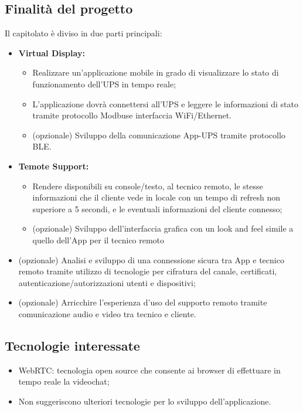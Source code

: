 	\subsection{Finalità del progetto}
		Il capitolato è diviso in due parti principali:
		\begin {itemize}
			\item \textbf{Virtual Display:}
			\begin{itemize}
				\item Realizzare un’applicazione mobile in grado di visualizzare lo stato di funzionamento dell’UPS in tempo reale;
				\item L’applicazione dovrà connettersi all’UPS e leggere le informazioni di stato tramite	protocollo Modbus\glo e interfaccia WiFi/Ethernet.
				\item (opzionale) Sviluppo della comunicazione App-UPS tramite protocollo BLE\glo.
			\end{itemize}
			\item \textbf{Temote Support:}
			\begin{itemize}
				\item Rendere disponibili su console/testo, al tecnico remoto, le stesse informazioni che il cliente vede in locale con un tempo di refresh non superiore a 5 secondi, e le eventuali informazioni del cliente connesso;
				\item (opzionale) Sviluppo dell’interfaccia grafica con un look and feel simile a quello dell’App per il tecnico remoto
			\end{itemize}
			\item (opzionale) Analisi e sviluppo di una connessione sicura tra App e tecnico remoto tramite utilizzo di	tecnologie per cifratura del canale, certificati, autenticazione/autorizzazioni utenti e dispositivi;
			\item (opzionale) Arricchire l’esperienza d’uso del supporto remoto tramite comunicazione audio e video tra	tecnico e cliente.
		\end {itemize}

	\subsection {Tecnologie interessate}
		\begin {itemize}
			\item WebRTC: tecnologia open source che consente ai browser di effettuare in tempo reale la videochat;
			\item Non suggeriscono ulteriori tecnologie per lo sviluppo dell'applicazione.
		\end {itemize}

